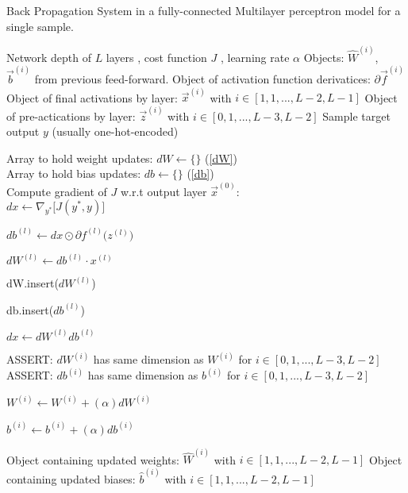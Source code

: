 \documentclass[12pt,letterpaper]{article}
\begin{document}
\begin{algorithm}
\label{back-prop}
\caption{Back Propagation System in a fully-connected Multilayer perceptron model for a single sample.}
\begin{algorithmic}

\REQUIRE Network depth of $L$ layers ,  cost function $J$ , learning rate $\alpha$
\REQUIRE Objects: $\hat{W}^{(i)}$, $\vec{b}^{(i)}$ from previous feed-forward.
\REQUIRE Object of activation function derivatices: $\partial\vec{f}^{(i)}$ 
\REQUIRE Object of final activations by layer: $\vec{x}^{(i)}$ with $i \in [1,1,...,L-2,L-1]$
\REQUIRE Object of pre-actications by layer: $\vec{z}^{(i)}$ with $i \in [0,1,...,L-3,L-2]$
\REQUIRE Sample target output $y$ (usually one-hot-encoded)

Array to hold weight updates: $dW \leftarrow \big\{ \big\}$ (\ref{dW}) \\
Array to hold bias updates: $db \leftarrow \big\{ \big\}$ (\ref{db}) \\
Compute gradient of $J$ w.r.t output layer $\vec{x}^{(0)}$: \\

$dx \leftarrow \nabla_{y^*} \big[ J(y^*,y) \big]$ \\

\item $db^{(l)} \leftarrow dx \odot \partial f^{(l)}\big(z^{(l)}\big)$
\item $dW^{(l)} \leftarrow db^{(l)} \cdot x^{(l)}$
\item dW.insert($dW^{(l)}$)
\item db.insert($db^{(l)}$)
\item $dx \leftarrow dW^{(l)} db^({l})$
\ENDFOR

ASSERT: $dW^{(i)}$ has same dimension as $W^{(i)}$ for $i \in [0,1,...,L-3,L-2]$ \\
ASSERT: $db^{(i)}$ has same dimension as $b^{(i)}$ for $i \in [0,1,...,L-3,L-2]$ \\

\item $W^{(i)} \leftarrow W^{(i)} + (\alpha) dW^{(i)}$
\item $b^{(i)} \leftarrow b^{(i)} + (\alpha) db^{(i)}$
\ENDFOR

\RETURN Object containing updated weights: $\hat{W}^{(i)}$ with $i \in [1,1,...,L-2,L-1]$
\RETURN Object containing updated biases: $\hat{b}^{(i)}$ with $i \in [1,1,...,L-2,L-1]$

\end{algorithmic}
\end{algorithm}
\end{document}

